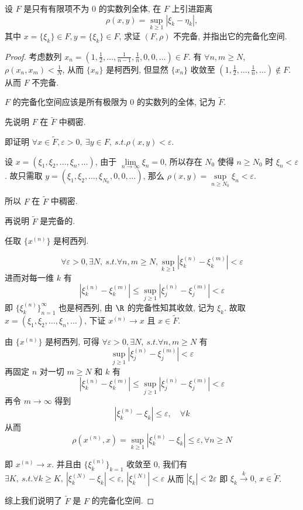 \problem[1.2.3] 设 $F$ 是只有有限项不为 $0$ 的实数列全体, 在 $F$ 上引进距离 $$\rho(x,y)=\sup\limits_{k\geqslant 1}|\xi_k-\eta_k|,$$ 其中 $x=\{\xi_k\}\in F,y=\{\xi_k\}\in F$, 求证 $(F,\rho)$ 不完备, 并指出它的完备化空间.

\begin{proof}
	考虑数列 $x_n=(1,\frac 1 2,\ldots,\frac 1 {n-1},\frac 1 n,0,0,\ldots)\in F$. 有 $\forall n,m\geqslant N$, $\rho(x_n,x_m)<\frac 1 N$, 从而 $\{x_n\}$ 是柯西列, 但显然 $\{x_n\}$ 收敛至 $(1,\frac 1 2,\ldots,\frac 1 n,\ldots)\notin F$. 从而 $F$ 不完备.

	$F$ 的完备化空间应该是所有极限为 0 的实数列的全体, 记为 $\widetilde{F}$.

	先说明 $F$ 在 $\widetilde{F}$ 中稠密.

	即证明 $\forall x\in\widetilde{F}, \varepsilon>0,\ \exists y\in F,\ s.t. \rho(x,y)<\varepsilon$.

	设 $x=(\xi_1,\xi_2,\ldots,\xi_n,\ldots)$, 由于 $\lim\limits_{n\to\infty}\xi_n=0$, 所以存在 $N_0$ 使得 $n\geqslant N_0$ 时 $\xi_n<\varepsilon$. 故只需取 $y=(\xi_1,\xi_2,\ldots,\xi_{N_0},0,0,\ldots)$, 那么 $\rho(x,y)=\sup\limits_{n\geqslant N_0}\xi_n<\varepsilon$.

	所以 $F$ 在 $\widetilde{F}$ 中稠密.

	再说明 $\widetilde{F}$ 是完备的.

	任取 $\{x^{(n)}\}$ 是柯西列.

	$$\forall \varepsilon>0,\exists N,\ s.t. \forall n,m\geqslant N,\sup\limits_{k\geqslant 1}|\xi_k^{(n)}-\xi_k^{(m)}|<\varepsilon$$ 进而对每一维 $k$ 有 $$|\xi_k^{(n)}-\xi_k^{(m)}|\leqslant\sup\limits_{j\geqslant 1}|\xi_j^{(n)}-\xi_j^{(m)}|<\varepsilon$$ 即 $\{\xi_k^{(n)}\}_{n=1}^\infty$ 也是柯西列, 由 $\R$ 的完备性知其收敛, 记为 $\xi_k$. 故取 $x=(\xi_1,\xi_2,\ldots,\xi_n,\ldots)$, 下证 $x^{(n)}\to x$ 且 $x\in \widetilde{F}$.

	由 $\{x^{(n)}\}$ 是柯西列, 可得 $\forall \varepsilon>0,\exists N,\ s.t.\forall n,m\geqslant N$ 有 $$\sup\limits_{j\geqslant 1}|\xi_j^{(n)}-\xi_j^{(m)}|<\varepsilon$$ 再固定 $n$ 对一切 $m\geqslant N$ 和 $k$ 有 $$|\xi_k^{(n)}-\xi_k^{(m)}|\leqslant\sup\limits_{j\geqslant 1}|\xi_j^{(n)}-\xi_j^{(m)}|<\varepsilon$$ 再令 $m\to\infty$ 得到 $$|\xi_k^{(n)}-\xi_k|\leqslant \varepsilon,\quad \forall k$$ 从而 $$
		\rho(x^{(n)},x)=\sup\limits_{k\geqslant 1}|\xi_k^{(n)}-\xi_k|\leqslant\varepsilon,\forall n\geqslant N\label{hw1.2.3}
	$$

	即 $x^{(n)}\to x$. 并且由 $\{\xi_k^{(n)}\}_{k=1}$ 收敛至 $0$, 我们有 $\exists K,\ s.t.\forall k\geqslant K, \ |\xi_k^{(N)}-\xi_k|<\varepsilon,\ |\xi_k^{(N)}|<\varepsilon$ 从而 $|\xi_k|<2\varepsilon$ 即 $\xi_k\overset{k}{\to}0$, $x\in \widetilde{F}$.

	综上我们说明了 $\widetilde{F}$ 是 $F$ 的完备化空间.


\end{proof}


